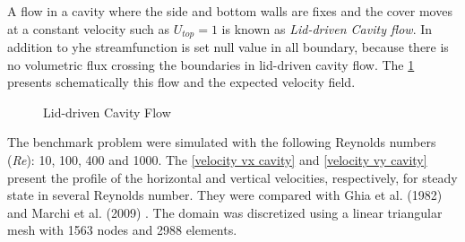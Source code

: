 A flow in a cavity where the side and bottom walls are fixes and 
the cover moves at a constant velocity such as \textit{$U_{top}=1$} 
is known as \textit {Lid-driven Cavity flow}.
In addition to 
yhe streamfunction is set null value in all boundary, 
because there is no volumetric flux crossing the boundaries 
in lid-driven cavity flow.
The \ref{cavity} presents schematically this flow and 
the expected velocity field.

\vspace{1cm}
\begin{figure}[H]
\caption{Lid-driven Cavity Flow}
\begin{center}
\end{center}
\label{cavity}
\end{figure}

\bigskip
The benchmark problem were simulated with the following 
Reynolds numbers (\textit{Re}): 10, 100, 400 and 1000.
The \ref{velocity vx cavity} and \ref{velocity vy cavity} 
present the profile of the horizontal and vertical velocities,
respectively,
for steady state in several Reynolds number. 
They were compared with 
Ghia et al. (1982) \cite{ghia1982} and 
Marchi et al. (2009) \cite{marchi2009}. 
The domain was discretized using a linear triangular mesh 
with 1563 nodes and 2988 elements.

